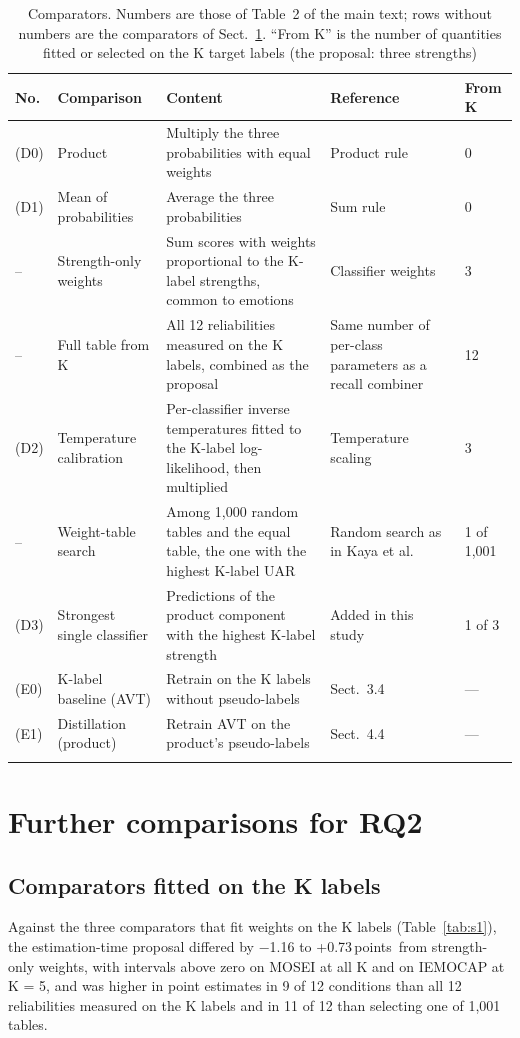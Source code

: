 \documentclass[sn-nature,pdflatex]{sn-jnl}
\newcommand{\pt}{\,points}
\begin{document}
\begin{table}[h]
\caption{Comparators. Numbers are those of Table~2 of the main text; rows without numbers are the comparators of Sect.~\ref{sec:s6}. ``From K'' is the number of quantities fitted or selected on the K target labels (the proposal: three strengths)}\label{tab:comparators}
\footnotesize\setlength{\tabcolsep}{4pt}
\begin{tabular}{@{}lp{2.8cm}p{4.0cm}p{2.5cm}l@{}}
\toprule
No. & Comparison & Content & Reference & From K \\
\midrule
(D0) & Product & Multiply the three probabilities with equal weights & Product rule \cite{kittler1998} & 0 \\
(D1) & Mean of probabilities & Average the three probabilities & Sum rule \cite{kittler1998} & 0 \\
-- & Strength-only weights & Sum scores with weights proportional to the K-label strengths, common to emotions & Classifier weights \cite{kuncheva2014} & 3 \\
-- & Full table from K & All 12 reliabilities measured on the K labels, combined as the proposal & Same number of per-class parameters as a recall combiner \cite{kuncheva2014} & 12 \\
(D2) & Temperature calibration & Per-classifier inverse temperatures fitted to the K-label log-likelihood, then multiplied & Temperature scaling \cite{guo2017calibration} & 3 \\
-- & Weight-table search & Among 1,000 random tables and the equal table, the one with the highest K-label UAR & Random search as in Kaya et al.\ \cite{kaya2017} & 1 of 1,001 \\
(D3) & Strongest single classifier & Predictions of the product component with the highest K-label strength & Added in this study & 1 of 3 \\
(E0) & K-label baseline (AVT) & Retrain on the K labels without pseudo-labels & Sect.~3.4 & --- \\
(E1) & Distillation (product) & Retrain AVT on the product's pseudo-labels & Sect.~4.4 & --- \\
\botrule
\end{tabular}
\end{table}

\section{Further comparisons for RQ2}\label{sec:s6}
\subsection{Comparators fitted on the K labels}
Against the three comparators that fit weights on the K labels (Table~\ref{tab:s1}), the estimation-time proposal differed by $-$1.16 to +0.73\pt\ from strength-only weights, with intervals above zero on MOSEI at all K and on IEMOCAP at K = 5, and was higher in point estimates in 9 of 12 conditions than all 12 reliabilities measured on the K labels and in 11 of 12 than selecting one of 1,001 tables.
\end{document}
